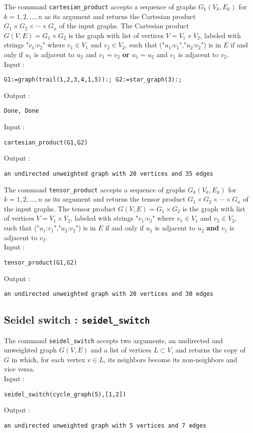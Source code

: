 \documentclass[a4paper,11pt]{article}
\begin{document}
The command {\tt cartesian\_product} accepts a sequence of graphs $ G_k(V_k,E_k) $ for $ k=1,2,\dots,n $ as its argument and returns the Cartesian product $ G_1\times G_2\times\cdots\times G_n $ of the input graphs. The Cartesian product $ G(V,E)=G_1\times G_2 $ is the graph with list of vertices $ V=V_1\times V_2 $, labeled with strings "$ v_1 $:$ v_2 $" where $ v_1\in V_1 $ and $ v_2\in V_2 $, such that ("$ u_1 $:$ v_1 $","$ u_2 $:$ v_2 $") is in $ E $ if and only if $ u_1 $ is adjacent to $ u_2 $ and $ v_1=v_2 $ \textbf{or} $ u_1=u_2 $ and $ v_1 $ is adjacent to $ v_2 $.\\
Input :
\begin{center}
  \tt G1:=graph(trail(1,2,3,4,1,5)):; G2:=star\_graph(3):;
\end{center}
Output :
\begin{center}
  \tt Done, Done
\end{center}
Input :
\begin{center}
  \tt cartesian\_product(G1,G2)
\end{center}
Output :
\begin{center}
  \tt an undirected unweighted graph with 20 vertices and 35 edges
\end{center}

The command {\tt tensor\_product} accepts a sequence of graphs $ G_k(V_k,E_k) $ for $ k=1,2,\dots,n $ as its argument and returns the tensor product $ G_1\times G_2\times\cdots\times G_n $ of the input graphs. The tensor product $ G(V,E)=G_1\times G_2 $ is the graph with list of vertices $ V=V_1\times V_2 $, labeled with strings "$ v_1 $:$ v_2 $" where $ v_1\in V_1 $ and $ v_2\in V_2 $, such that ("$ u_1 $:$ v_1 $","$ u_2 $:$ v_2 $") is in $ E $ if and only if $ u_1 $ is adjacent to $ u_2 $ \textbf{and} $ v_1 $ is adjacent to $ v_2 $.\\
Input :
\begin{center}
  \tt tensor\_product(G1,G2)
\end{center}
Output :
\begin{center}
  \tt an undirected unweighted graph with 20 vertices and 30 edges
\end{center}

\subsection{Seidel switch : {\tt seidel\_switch}}

The command {\tt seidel\_switch} accepts two arguments, an undirected and unweighted graph $ G(V,E) $ and a list of vertices $ L\subset V $, and returns the copy of $ G $ in which, for each vertex $ v\in L $, its neighbors become its non-neighbors and vice versa.\\
Input :
\begin{center}
  \tt seidel\_switch(cycle\_graph(5),[1,2])
\end{center}
Output :
\begin{center}
  \tt an undirected unweighted graph with 5 vertices and 7 edges
\end{center}
\end{document}
